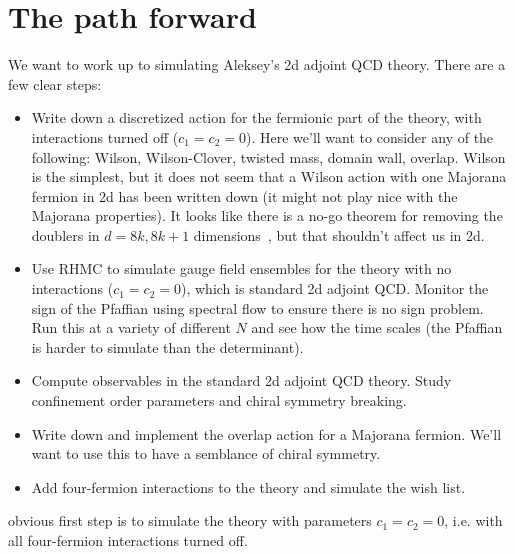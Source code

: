 
\section{The path forward}

We want to work up to simulating Aleksey's 2d adjoint QCD theory. There are a few clear steps:
\begin{itemize}
	\item Write down a discretized action for the fermionic part of the theory, with interactions turned off ($c_1 = c_2 = 0$). Here we'll want to consider any of the following: Wilson, Wilson-Clover, twisted mass, domain wall, overlap. Wilson is the simplest, but it does not seem that a Wilson action with one Majorana fermion in 2d has been written down (it might not play nice with the Majorana properties). It looks like there is a no-go theorem for removing the doublers in $d = 8k, 8k + 1$ dimensions~\cite{Suzuki:2004ht}, but that shouldn't affect us in 2d. 
	\item Use RHMC to simulate gauge field ensembles for the theory with no interactions ($c_1 = c_2 = 0$), which is standard 2d adjoint QCD. Monitor the sign of the Pfaffian using spectral flow to ensure there is no sign problem. Run this at a variety of different $N$ and see how the time scales (the Pfaffian is harder to simulate than the determinant).
	\item Compute observables in the standard 2d adjoint QCD theory. Study confinement order parameters and chiral symmetry breaking. 
	\item Write down and implement the overlap action for a Majorana fermion. We'll want to use this to have a semblance of chiral symmetry. 
	\item Add four-fermion interactions to the theory and simulate the wish list. 
\end{itemize}

 obvious first step is to simulate the theory with parameters $c_1 = c_2 = 0$, i.e. with all four-fermion interactions turned off. 





